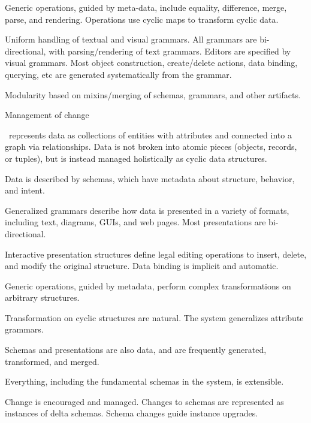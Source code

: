 Generic operations, guided by meta-data, include equality, difference,
merge, parse, and rendering. Operations use cyclic maps to transform 
cyclic data.

Uniform handling of textual and visual grammars. All grammars are bi-directional, with parsing/rendering of text grammars. Editors are specified by visual grammars. Most object construction, create/delete actions, data binding, querying, etc are generated systematically from the grammar.

Modularity based on mixins/merging of schemas, grammars, and other artifacts.

Management of change



\item \Enso\ represents data as collections of entities with attributes
and connected into a graph via relationships. 
Data is not broken into atomic pieces (objects, records, or tuples), but is
instead managed holistically as cyclic data structures.

\item Data is described by schemas, which have 
metadata about structure, behavior, and intent.

\item Generalized grammars describe how
data is presented in a variety of formats, including
text, diagrams, GUIs, and web pages.
Most presentations are bi-directional.

\item Interactive presentation structures define legal editing operations
to insert, delete, and modify the original structure.
Data binding is implicit and automatic.

\item Generic operations, guided by metadata, perform
complex transformations on arbitrary structures.

\item Transformation on cyclic structures are natural.
The system generalizes attribute grammars.

\item Schemas and presentations are also data, and 
are frequently generated, transformed, and merged.

\item Everything, including the fundamental schemas
in the system, is extensible.

\item Change is encouraged and managed. Changes to
schemas are represented as instances of delta schemas.
Schema changes guide instance upgrades.

